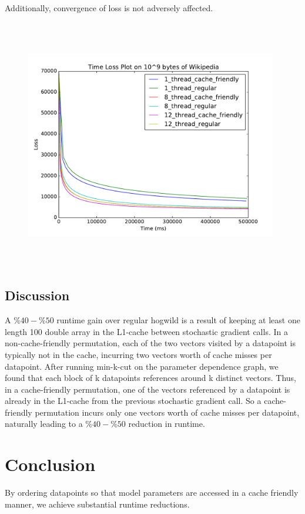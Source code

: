 \documentclass[times,11pt]{article}
\numberwithin{equation}{section}		%
\numberwithin{figure}{section}			%
\numberwithin{table}{section}				%
\begin{document}
Additionally, convergence of loss is not adversely affected.
\begin{figure}[H]
\begin{center}
\includegraphics[width=11cm,height=11cm,keepaspectratio]{w2v_time_loss_plot.pdf}
\end{center}
\end{figure}

\subsection{Discussion}

A $\%40-\%50$ runtime gain over regular hogwild is a result of keeping
at least one length 100 double array in the L1-cache between
stochastic gradient calls. In a non-cache-friendly permutation, each
of the two vectors visited by a datapoint is typically not in the
cache, incurring two vectors worth of cache misses per
datapoint. After running min-k-cut on the parameter dependence graph,
we found that each block of k datapoints references around k distinct
vectors. Thus, in a cache-friendly permutation, one of the vectors
referenced by a datapoint is already in the L1-cache from the previous
stochastic gradient call. So a cache-friendly permutation incurs only
one vectors worth of cache misses per datapoint, naturally leading to
a $\%40-\%50$ reduction in runtime.
\newpage
\section{Conclusion}
By ordering datapoints so that model parameters are accessed in a cache friendly manner, we achieve substantial runtime reductions.
\end{document}
